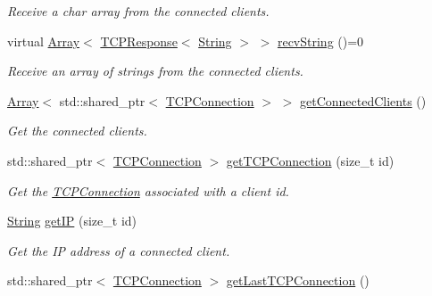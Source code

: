 \begin{DoxyCompactItemize}
\begin{DoxyCompactList}\small\item\em Receive a char array from the connected clients. \end{DoxyCompactList}\item 
virtual \mbox{\hyperlink{class_rad_j_a_v_1_1_array}{Array}}$<$ \mbox{\hyperlink{class_rad_j_a_v_1_1_networking_1_1_t_c_p_response}{T\+C\+P\+Response}}$<$ \mbox{\hyperlink{class_rad_j_a_v_1_1_string}{String}} $>$ $>$ \mbox{\hyperlink{class_rad_j_a_v_1_1_networking_1_1_tcpip_server_a37673e5cbe7b29894edc663e5d6d80e4}{recv\+String}} ()=0
\begin{DoxyCompactList}\small\item\em Receive an array of strings from the connected clients. \end{DoxyCompactList}\item 
\mbox{\hyperlink{class_rad_j_a_v_1_1_array}{Array}}$<$ std\+::shared\+\_\+ptr$<$ \mbox{\hyperlink{class_rad_j_a_v_1_1_networking_1_1_t_c_p_connection}{T\+C\+P\+Connection}} $>$ $>$ \mbox{\hyperlink{class_rad_j_a_v_1_1_networking_1_1_tcpip_server_a3c8ddbb801687824fd36a283d0b179c8}{get\+Connected\+Clients}} ()
\begin{DoxyCompactList}\small\item\em Get the connected clients. \end{DoxyCompactList}\item 
std\+::shared\+\_\+ptr$<$ \mbox{\hyperlink{class_rad_j_a_v_1_1_networking_1_1_t_c_p_connection}{T\+C\+P\+Connection}} $>$ \mbox{\hyperlink{class_rad_j_a_v_1_1_networking_1_1_tcpip_server_a46784693ec9b7fef599d4959ddc5df51}{get\+T\+C\+P\+Connection}} (size\+\_\+t id)
\begin{DoxyCompactList}\small\item\em Get the \mbox{\hyperlink{class_rad_j_a_v_1_1_networking_1_1_t_c_p_connection}{T\+C\+P\+Connection}} associated with a client id. \end{DoxyCompactList}\item 
\mbox{\hyperlink{class_rad_j_a_v_1_1_string}{String}} \mbox{\hyperlink{class_rad_j_a_v_1_1_networking_1_1_tcpip_server_a1c37e1e3c62d197ec35903d828ebbd1f}{get\+IP}} (size\+\_\+t id)
\begin{DoxyCompactList}\small\item\em Get the IP address of a connected client. \end{DoxyCompactList}\item 
std\+::shared\+\_\+ptr$<$ \mbox{\hyperlink{class_rad_j_a_v_1_1_networking_1_1_t_c_p_connection}{T\+C\+P\+Connection}} $>$ \mbox{\hyperlink{class_rad_j_a_v_1_1_networking_1_1_tcpip_server_ab3161184633ef9072ba431ca45c408a9}{get\+Last\+T\+C\+P\+Connection}} ()

\end{DoxyCompactItemize}
